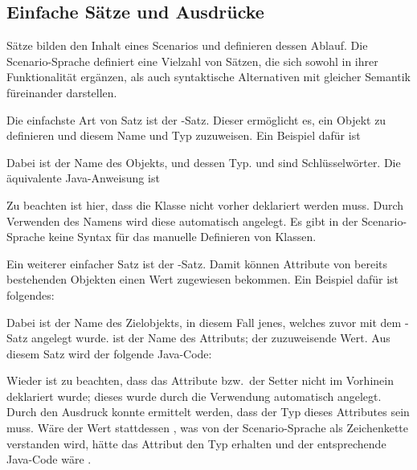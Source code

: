 \subsection{Einfache Sätze und Ausdrücke}\label{subsec:simple-sentences-and-expressions}

Sätze bilden den Inhalt eines Scenarios und definieren dessen Ablauf.
Die Scenario-Sprache definiert eine Vielzahl von Sätzen,
die sich sowohl in ihrer Funktionalität ergänzen,
als auch syntaktische Alternativen mit gleicher Semantik füreinander darstellen.

Die einfachste Art von Satz ist der -Satz.
Dieser ermöglicht es, ein Objekt zu definieren und diesem Name und Typ zuzuweisen.
Ein Beispiel dafür ist


Dabei ist  der Name des Objekts,
und  dessen Typ.
 und  sind Schlüsselwörter.
Die äquivalente Java-Anweisung ist


Zu beachten ist hier, dass die Klasse  nicht vorher deklariert werden muss.
Durch Verwenden des Namens wird diese automatisch angelegt.
Es gibt in der Scenario-Sprache keine Syntax für das manuelle Definieren von Klassen.

Ein weiterer einfacher Satz ist der -Satz.
Damit können Attribute von bereits bestehenden Objekten einen Wert zugewiesen bekommen.
Ein Beispiel dafür ist folgendes:


Dabei ist  der Name des Zielobjekts, in diesem Fall jenes, welches zuvor mit dem -Satz angelegt wurde.
 ist der Name des Attributs;  der zuzuweisende Wert.
Aus diesem Satz wird der folgende Java-Code:


Wieder ist zu beachten, dass das Attribute  bzw.\ der Setter  nicht im Vorhinein deklariert wurde;
dieses wurde durch die Verwendung automatisch angelegt.
Durch den Ausdruck  konnte ermittelt werden, dass der Typ dieses Attributes  sein muss.
Wäre der Wert stattdessen , was von der Scenario-Sprache als Zeichenkette verstanden wird,
hätte das Attribut den Typ  erhalten und der entsprechende Java-Code wäre .

